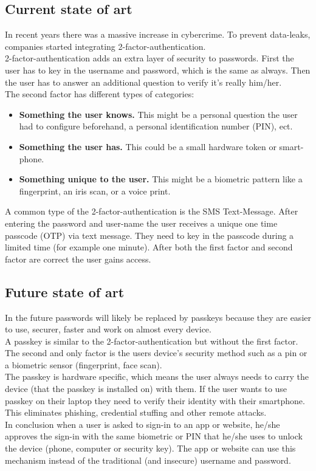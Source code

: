 \documentclass[conference]{IEEEtran}
\begin{document}
\subsection{Current state of art}
\cite{b4}In recent years there was a massive increase in cybercrime. To prevent data-leaks, companies started integrating 2-factor-authentication.\\
2-factor-authentication adds an extra layer of security to passwords. First the user has to key in the username and password, which is the same as always. Then the user has to answer an additional question to verify it's really him/her.\\
The second factor has different types of categories:
\begin{itemize}
\item \textbf{Something the user knows.}  This might be a personal question the user had to configure beforehand, a personal identification number (PIN), ect.
\item \textbf{Something the user has.} This could be a small hardware token or smart-phone.
\item \textbf{Something unique to the user.} This might be a  biometric pattern like a fingerprint, an iris scan, or a voice print. 
\end{itemize}
A common type of the 2-factor-authentication is the SMS Text-Message. After entering the password and user-name the user receives a unique one time passcode (OTP) via text message. They need to key in the passcode during a limited time (for example one minute). After both the first factor and second factor are correct the user gains access.
                                                                                               
\subsection{Future state of art}
\cite{b5} In the future passwords will likely be replaced by passkeys because they are easier to use, securer, faster and work on almost every device.\\
A passkey is similar to the 2-factor-authentication but without the first factor. The second and only factor is the users device's security method such as a pin or a biometric sensor (fingerprint, face scan). \\
The passkey is hardware specific, which means the user always needs to carry the device (that the passkey is installed on) with them. If the user wants to use passkey on their laptop they need to verify their identity with their smartphone. This eliminates phishing, credential stuffing and other remote attacks. \\
In conclusion when a user is asked to sign-in to an app or website, he/she approves the sign-in with the same biometric or PIN that he/she uses to unlock the device (phone, computer or security key). The app or website can use this mechanism instead of the traditional (and insecure) username and password. 
\end{document}
